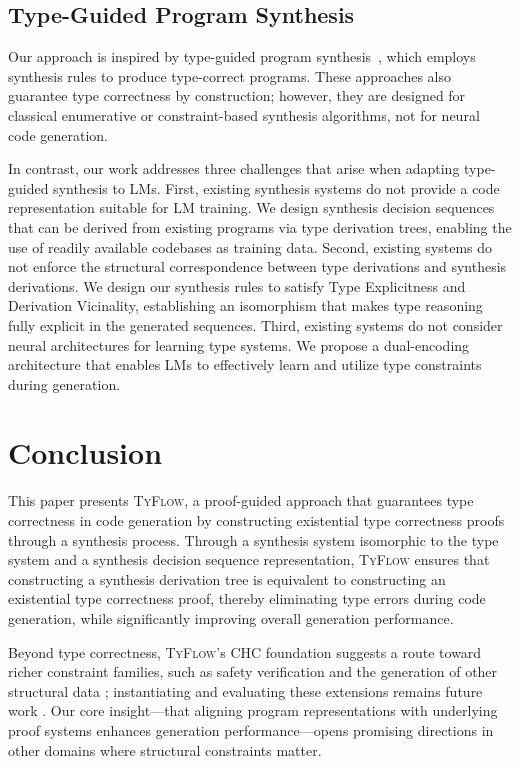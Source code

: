 \documentclass[manuscript,screen]{acmart}
\newcommand{\toolname}[1]{\textsc{#1}}
\newcommand{\mainname}{\toolname{TyFlow}\xspace}
\begin{document}
\subsection{Type-Guided Program Synthesis}
Our approach is inspired by type-guided program synthesis~\cite{DBLP:journals/pacmpl/GuoJJZWJP20, DBLP:conf/pldi/GuriaFH21, DBLP:conf/pldi/PolikarpovaKS16, DBLP:conf/pldi/OseraZ15}, which employs synthesis rules to produce type-correct programs. These approaches also guarantee type correctness by construction; however, they are designed for classical enumerative or constraint-based synthesis algorithms, not for neural code generation.

In contrast, our work addresses three challenges that arise when adapting type-guided synthesis to LMs.
First, existing synthesis systems do not provide a code representation suitable for LM training. We design synthesis decision sequences that can be derived from existing programs via type derivation trees, enabling the use of readily available codebases as training data.
Second, existing systems do not enforce the structural correspondence between type derivations and synthesis derivations. We design our synthesis rules to satisfy Type Explicitness and Derivation Vicinality, establishing an isomorphism that makes type reasoning fully explicit in the generated sequences.
Third, existing systems do not consider neural architectures for learning type systems. We propose a dual-encoding architecture that enables LMs to effectively learn and utilize type constraints during generation.

 

 \section{Conclusion \label{sec:conclusion}}
This paper presents \mainname, a proof-guided approach that guarantees type correctness in code generation by constructing existential type correctness proofs through a synthesis process. Through a synthesis system isomorphic to the type system and a synthesis decision sequence representation, \mainname ensures that constructing a synthesis derivation tree is equivalent to constructing an existential type correctness proof, thereby eliminating type errors during code generation, while significantly improving overall generation performance. 

Beyond type correctness, \mainname's    {\color{revblue}CHC foundation suggests a route toward richer constraint families, such as } safety verification and the generation of other structural data {\color{revblue}; instantiating and evaluating these extensions remains future work} . Our core insight---that aligning program representations with underlying proof systems enhances   generation performance---opens promising directions    {\color{revblue}in } other domains where structural constraints matter.
\end{document}
